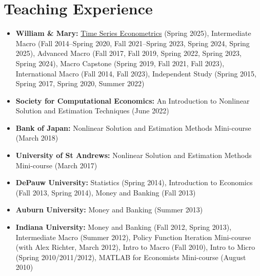 \documentclass[10pt,letterpaper,en-US]{article}
\begin{document}
\section*{Teaching Experience}

\begin{itemize}

\item \textbf{William \& Mary:} \href{https://econ.pages.code.wm.edu/408/docs/}{Time Series Econometrics} (Spring 2025), Intermediate Macro (Fall 2014--Spring 2020, Fall 2021--Spring 2023, Spring 2024, Spring 2025), Advanced Macro (Fall 2017, Fall 2019, Spring 2022, Spring 2023, Spring 2024), Macro Capstone (Spring 2019, Fall 2021, Fall 2023), International Macro (Fall 2014, Fall 2023), Independent Study (Spring 2015, Spring 2017, Spring 2020, Summer 2022)
\item \textbf{Society for Computational Economics:} An Introduction to Nonlinear Solution and Estimation Techniques (June 2022)
\item \textbf{Bank of Japan:} Nonlinear Solution and Estimation Methods Mini-course (March 2018)
\item \textbf{University of St Andrews:} Nonlinear Solution and Estimation Methods Mini-course (March 2017)
\item \textbf{DePauw University:} Statistics (Spring 2014), Introduction to Economics (Fall 2013, Spring 2014), Money and Banking (Fall 2013)
\item \textbf{Auburn University:} Money and Banking (Summer 2013)
\item \textbf{Indiana University:} Money and Banking (Fall 2012, Spring 2013), Intermediate Macro (Summer 2012), Policy Function Iteration Mini-course (with Alex Richter, March 2012), Intro to Macro (Fall 2010), Intro to Micro (Spring 2010/2011/2012), MATLAB for Economists Mini-course (August 2010)
\end{itemize}
\newpage
\end{document}
